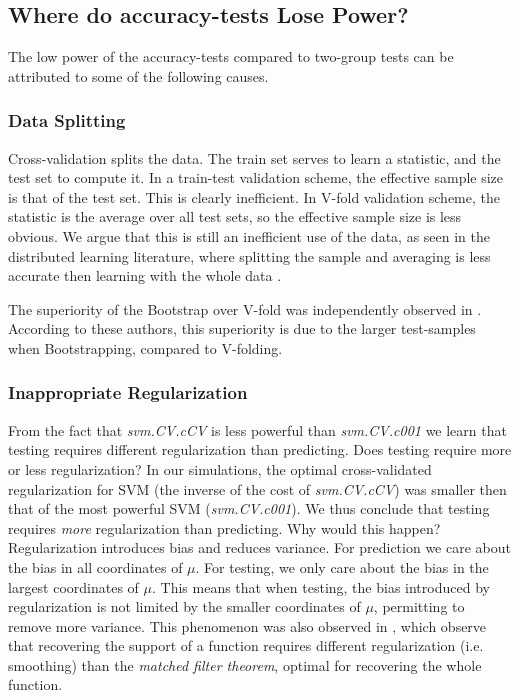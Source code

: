 \documentclass[oupdraft]{bio}
\begin{document}
\subsection{Where do accuracy-tests Lose Power?}
The low power of the accuracy-tests compared to two-group tests can be attributed to some of the following causes.

\subsubsection{Data Splitting}
Cross-validation splits the data.
The train set serves to learn a statistic, and the test set to compute it.
In a train-test validation scheme, the effective sample size is that of the test set.
This is clearly inefficient. 
In V-fold validation scheme, the statistic is the average over all test sets, so the effective sample size is less obvious. 
We argue that this is still an inefficient use of the data, as seen in the distributed learning literature, where splitting the sample and averaging is less accurate then learning with the whole data \citep{rosenblatt2016optimality}.

The superiority of the Bootstrap over V-fold was independently observed in \cite{yu2007two}. 
According to these authors, this superiority is due to the larger test-samples when Bootstrapping, compared to V-folding.


\subsubsection{Inappropriate Regularization}
From the fact that \emph{svm.CV.cCV} is less powerful than \emph{svm.CV.c001} we learn that testing requires different regularization than predicting.
Does testing require more or less regularization?
In our simulations, the optimal cross-validated regularization for SVM (the inverse of the cost of \emph{svm.CV.cCV}) was smaller then that of the most powerful SVM (\emph{svm.CV.c001}).
We thus conclude that testing requires \emph{more} regularization  than predicting. 
Why would this happen?
Regularization introduces bias and reduces variance. 
For prediction we care about the bias in all coordinates of $\mu$. 
For testing, we only care about the bias in the largest coordinates of $\mu$. 
This means that when testing, the bias introduced by regularization is not limited by the smaller coordinates of $\mu$, permitting to remove more variance. 
This phenomenon was also observed in \cite{cheng2017multiple}, which observe that recovering the support of a function requires different regularization (i.e. smoothing) than the \emph{matched filter theorem}, optimal for recovering the whole function.
\end{document}
